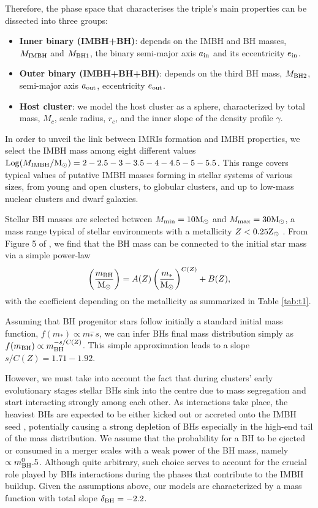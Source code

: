 \documentclass[twocolumn]{aastex62}
\newcommand{\Ms}{{\rm M}_\odot}
\newcommand{\Zs}{{\rm Z}_\odot}
\newcommand{\ibh}{{\rm IMBH}}
\newcommand{\inn}{{\rm in}}
\newcommand{\out}{{\rm out}}
\newcommand{\bh}{{\rm BH}}
\newcommand{\bhu}{{\rm BH1}}
\newcommand{\bhd}{{\rm BH2}}
\begin{document}
Therefore, the phase space that characterises the triple's main properties can be dissected into three groups:
\begin{itemize}
    \item {\bf Inner binary (IMBH+BH)}: depends on the IMBH and BH masses, $M_\ibh$ and $M_\bhu$, the binary semi-major axis $a_\inn$ and its eccentricity $e_\inn$.
    \item {\bf Outer binary (IMBH+BH+BH)}: depends on the third BH mass, $M_\bhd$, semi-major axis $a_\out$, eccentricity $e_\out$.
    \item {\bf Host cluster}: we model the host cluster as a \cite{Deh93} sphere, characterized by total mass, $M_c$, scale radius, $r_c$, and the inner slope of the density profile $\gamma$.
\end{itemize}

In order to unveil the link between IMRIs formation and IMBH properties, we select the IMBH mass among eight different values ${\rm Log}(M_\ibh/\Ms) = 2-2.5-3-3.5-4-4.5-5-5.5$. This range covers typical values of putative IMBH masses forming in stellar systems of various sizes, from young and open clusters, to globular clusters, and up to low-mass nuclear clusters and dwarf galaxies.

Stellar BH masses are selected between $M_{\rm min} = 10\Ms$ and $M_{\rm max} = 30\Ms$, a mass range typical of stellar environments with a metallicity $Z<0.25\Zs$ \citep{belczynski16,spera16}. 
From Figure 5 of \cite{belczynski16}, we find that the BH mass can be connected to the initial star mass via a simple power-law 
\begin{equation}
\left(\frac{m_\bh}{\Ms}\right) = A(Z) \left(\frac{m_*}{\Ms}\right)^{C(Z)} + B(Z),
\end{equation}
with the coefficient depending on the metallicity as summarized in Table \ref{tab:t1}.

Assuming that BH progenitor stars follow initially a standard \cite{kroupa01} initial mass function, $f(m_*) \propto m_*^-s$, we can infer BHs final mass distribution simply as $f(m_\bh)\propto m_\bh^{-s/C(Z)}$. This simple approximation leads to a slope $s/C(Z) = 1.71-1.92$. 

However, we must take into account the fact that during clusters' early evolutionary stages stellar BHs sink into the centre due to mass segregation and start interacting strongly among each other.
As interactions take place, the heaviest BHs are expected to be either kicked out or accreted onto the IMBH seed \citep{giersz15,AAG18a}, potentially causing a strong depletion of BHs especially in the high-end tail of the mass distribution. We assume that the probability for a BH to be ejected or consumed in a merger scales with a weak power of the BH mass, namely $ \propto m_\bh^0.5$. Although quite arbitrary, such choice serves to account for the crucial role played by BHs interactions during the phases that contribute to the IMBH buildup. Given the assumptions above, our models are characterized by a mass function with total slope $\delta_\bh = -2.2$.
\end{document}
